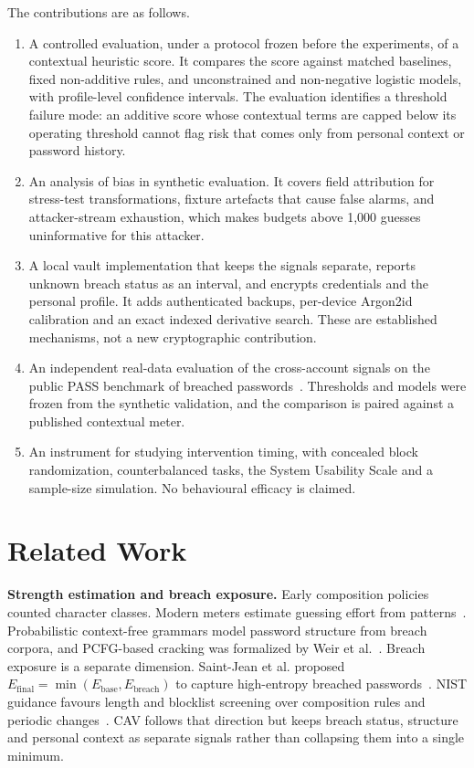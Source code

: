\documentclass[conference]{IEEEtran}
\begin{document}
The contributions are as follows.
\begin{enumerate}
\item A controlled evaluation, under a protocol frozen before the experiments, of a contextual heuristic score. It compares the score against matched baselines, fixed non-additive rules, and unconstrained and non-negative logistic models, with profile-level confidence intervals. The evaluation identifies a threshold failure mode: an additive score whose contextual terms are capped below its operating threshold cannot flag risk that comes only from personal context or password history.
\item An analysis of bias in synthetic evaluation. It covers field attribution for stress-test transformations, fixture artefacts that cause false alarms, and attacker-stream exhaustion, which makes budgets above 1,000 guesses uninformative for this attacker.
\item A local vault implementation that keeps the signals separate, reports unknown breach status as an interval, and encrypts credentials and the personal profile. It adds authenticated backups, per-device Argon2id calibration and an exact indexed derivative search. These are established mechanisms, not a new cryptographic contribution.
\item An independent real-data evaluation of the cross-account signals on the public PASS benchmark of breached passwords~\cite{pass}. Thresholds and models were frozen from the synthetic validation, and the comparison is paired against a published contextual meter.
\item An instrument for studying intervention timing, with concealed block randomization, counterbalanced tasks, the System Usability Scale and a sample-size simulation. No behavioural efficacy is claimed.
\end{enumerate}

\section{Related Work}
\textbf{Strength estimation and breach exposure.} Early composition policies counted character classes. Modern meters estimate guessing effort from patterns~\cite{wheeler}. Probabilistic context-free grammars model password structure from breach corpora, and PCFG-based cracking was formalized by Weir et al.~\cite{weir}. Breach exposure is a separate dimension. Saint-Jean et al. proposed $E_{\text{final}}=\min(E_{\text{base}},E_{\text{breach}})$ to capture high-entropy breached passwords~\cite{saintjean}. NIST guidance favours length and blocklist screening over composition rules and periodic changes~\cite{nist63b4}. CAV follows that direction but keeps breach status, structure and personal context as separate signals rather than collapsing them into a single minimum.
\end{document}
